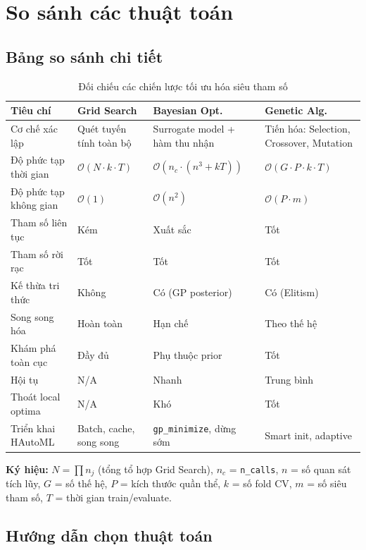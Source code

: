 \documentclass[12pt,a4paper]{article}
\begin{document}
\section{So sánh các thuật toán}
\label{sec:comparison}

\subsection{Bảng so sánh chi tiết}

\begin{table}[H]
\centering
\caption{Đối chiếu các chiến lược tối ưu hóa siêu tham số}
\label{tab:comparison}
\renewcommand{\arraystretch}{1.3}
\small
\begin{tabularx}{\textwidth}{l X X X}
\toprule
\textbf{Tiêu chí} & \textbf{Grid Search} & \textbf{Bayesian Opt.} & \textbf{Genetic Alg.} \\
\midrule
Cơ chế xác lập & Quét tuyến tính toàn bộ & Surrogate model + hàm thu nhận & Tiến hóa: Selection, Crossover, Mutation \\
Độ phức tạp thời gian & $\mathcal{O}(N \cdot k \cdot T)$ & $\mathcal{O}(n_c \cdot (n^3 + kT))$ & $\mathcal{O}(G \cdot P \cdot k \cdot T)$ \\
Độ phức tạp không gian & $\mathcal{O}(1)$ & $\mathcal{O}(n^2)$ & $\mathcal{O}(P \cdot m)$ \\
Tham số liên tục & Kém & Xuất sắc & Tốt \\
Tham số rời rạc & Tốt & Tốt & Tốt \\
Kế thừa tri thức & Không & Có (GP posterior) & Có (Elitism) \\
Song song hóa & Hoàn toàn & Hạn chế & Theo thế hệ \\
Khám phá toàn cục & Đầy đủ & Phụ thuộc prior & Tốt \\
Hội tụ & N/A & Nhanh & Trung bình \\
Thoát local optima & N/A & Khó & Tốt \\
Triển khai HAutoML & Batch, cache, song song & \texttt{gp\_minimize}, dừng sớm & Smart init, adaptive \\
\bottomrule
\end{tabularx}
\end{table}

\noindent\textbf{Ký hiệu:} $N = \prod n_j$ (tổng tổ hợp Grid Search),
$n_c$ = \texttt{n\_calls}, $n$ = số quan sát tích lũy, $G$ = số thế hệ,
$P$ = kích thước quần thể, $k$ = số fold CV, $m$ = số siêu tham số,
$T$ = thời gian train/evaluate.

\subsection{Hướng dẫn chọn thuật toán}
\end{document}
